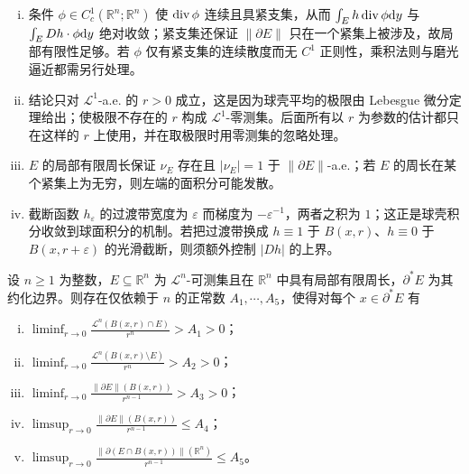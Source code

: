 \documentclass[../../main.tex]{subfiles}%
\begin{document}
\begin{remark}\label{remark:ch05-lem-5-2-条件}
\begin{enumerate}[(i)]
\item 条件 $\phi\in C_c^1(\mathbb{R}^n;\mathbb{R}^n)$ 使 $\operatorname{div}\phi$ 连续且具紧支集，从而 $\int_E h\operatorname{div}\phi\mathrm{d} y$ 与 $\int_E Dh\cdot\phi\mathrm{d} y$ 绝对收敛；紧支集还保证 $\lVert\partial E\rVert$ 只在一个紧集上被涉及，故局部有限性足够。若 $\phi$ 仅有紧支集的连续散度而无 $C^1$ 正则性，乘积法则与磨光逼近都需另行处理。
\item 结论只对 $\mathcal{L}^1$-a.e. 的 $r>0$ 成立，这是因为球壳平均的极限由 Lebesgue 微分定理给出；使极限不存在的 $r$ 构成 $\mathcal{L}^1$-零测集。后面所有以 $r$ 为参数的估计都只在这样的 $r$ 上使用，并在取极限时用零测集的忽略处理。
\item $E$ 的局部有限周长保证 $\nu_E$ 存在且 $\lvert\nu_E\rvert=1$ 于 $\lVert\partial E\rVert$-a.e.；若 $E$ 的周长在某个紧集上为无穷，则左端的面积分可能发散。
\item 截断函数 $h_\varepsilon$ 的过渡带宽度为 $\varepsilon$ 而梯度为 $-\varepsilon^{-1}$，两者之积为 $1$；这正是球壳积分收敛到球面积分的机制。若把过渡带换成 $h\equiv1$ 于 $B(x,r)$、$h\equiv0$ 于 $B(x,r+\varepsilon)$ 的光滑截断，则须额外控制 $\lvert Dh\rvert$ 的上界。
\end{enumerate}
\end{remark}

\begin{lemma}[约化边界点处的局部估计]\label{lemma:ch05-5-3}
设 $n\geqslant1$ 为整数，$E\subseteq\mathbb{R}^n$ 为 $\mathcal{L}^n$-可测集且在 $\mathbb{R}^n$ 中具有局部有限周长，$\partial^*E$ 为其约化边界。则存在仅依赖于 $n$ 的正常数 $A_1,\cdots,A_5$，使得对每个 $x\in\partial^*E$ 有
\begin{enumerate}[(i)]
\item $\displaystyle\liminf_{r\to0}\frac{\mathcal{L}^n(B(x,r)\cap E)}{r^n}>A_1>0$；
\item $\displaystyle\liminf_{r\to0}\frac{\mathcal{L}^n(B(x,r)\setminus E)}{r^n}>A_2>0$；
\item $\displaystyle\liminf_{r\to0}\frac{\lVert\partial E\rVert(B(x,r))}{r^{n-1}}>A_3>0$；
\item $\displaystyle\limsup_{r\to0}\frac{\lVert\partial E\rVert(B(x,r))}{r^{n-1}}\leqslant A_4$；
\item $\displaystyle\limsup_{r\to0}\frac{\lVert\partial(E\cap B(x,r))\rVert(\mathbb{R}^n)}{r^{n-1}}\leqslant A_5$。
\end{enumerate}
\end{lemma}
\end{document}
